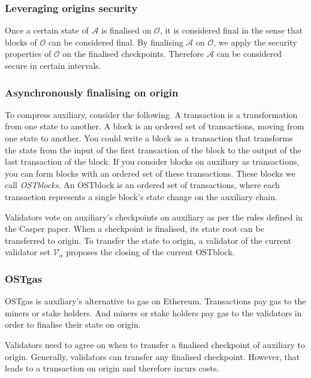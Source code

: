 \documentclass[12pt,a4paper,draft]{article}
\newcommand{\A}{\mathcal{A}}
\newcommand{\OC}{\mathcal{O}}
\newcommand{\V}{\mathcal{V}}
\begin{document}
\subsubsection{Leveraging origins security}

Once a certain state of $\A$ is finalised on $\OC$, it is considered final in the sense that blocks of $\OC$ can be considered final.
By finalising $\A$ on $\OC$, we apply the security properties of $\OC$ on the finalised checkpoints.
Therefore $\A$ can be considered secure in certain intervals.

\subsubsection{Asynchronously finalising on origin}

To compress auxiliary, consider the following.
A transaction is a transformation from one state to another.
A block is an ordered set of transactions, moving from one state to another.
You could write a block as a transaction that transforms the state from the input of the first transaction of the block to the output of the last transaction of the block.
If you consider blocks on auxiliary as transactions, you can form blocks with an ordered set of these transactions.
These blocks we call \emph{OSTblocks.}
An OSTblock is an ordered set of transactions, where each transaction represents a single block's state change on the auxiliary chain.



Validators vote on auxiliary's checkpoints on auxiliary as per the rules defined in the Casper paper.
When a checkpoint is finalised, its state root can be transferred to origin.
To transfer the state to origin, a validator of the current validator set $\V_\alpha$ proposes the closing of the current OSTblock.


\subsubsection{OSTgas}

OSTgas is auxiliary's alternative to gas on Ethereum.
Transactions pay gas to the miners or stake holders.
And miners or stake holders pay gas to the validators in order to finalise their state on origin.

Validators need to agree on when to transfer a finalised checkpoint of auxiliary to origin.
Generally, validators can transfer any finalised checkpoint.
However, that leads to a transaction on origin and therefore incurs costs.
\end{document}
